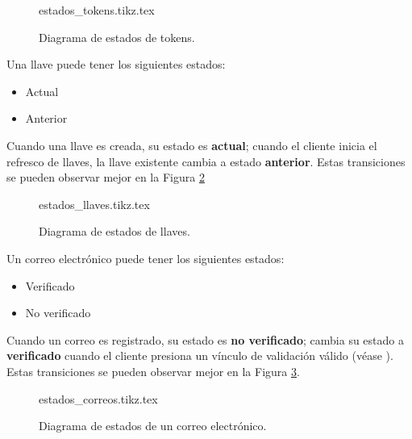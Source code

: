 \begin{figure}
  \begin{center}
    {estados_tokens.tikz.tex}
    \caption{Diagrama de estados de tokens.}
    \label{estados_token}
  \end{center}
\end{figure}

{
  Una llave puede tener los siguientes estados:
  \begin{itemize}
    \item Actual
    \item Anterior
  \end{itemize}

  \begin{hangparas}{2em}{0}
    Cuando una llave es creada, su estado es \textbf{actual}; cuando el cliente
    inicia el refresco de llaves, la llave existente cambia a estado
    \textbf{anterior}. Estas transiciones se pueden observar mejor en la Figura
    \ref{estados_llave}
  \end{hangparas}
}

\begin{figure}
  \begin{center}
    {estados_llaves.tikz.tex}
    \caption{Diagrama de estados de llaves.}
    \label{estados_llave}
  \end{center}
\end{figure}

{
  Un correo electrónico puede tener los siguientes estados:
  \begin{itemize}
    \item Verificado
    \item No verificado
  \end{itemize}

  \begin{hangparas}{2em}{0}
    Cuando un correo es registrado, su estado es \textbf{no verificado}; cambia
    su estado a \textbf{verificado} cuando el cliente presiona un vínculo de
    validación válido (véase ). Estas
    transiciones se pueden observar mejor en la Figura \ref{estados_correo}.
  \end{hangparas}
}

\begin{figure}
  \begin{center}
    {estados_correos.tikz.tex}
    \caption{Diagrama de estados de un correo electrónico.}
    \label{estados_correo}
  \end{center}
\end{figure}

